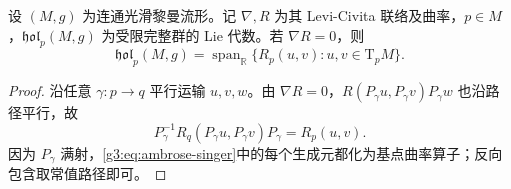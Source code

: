 \begin{corollary}\label{g3:cor:parallel-curvature-holonomy}
	设 \((M,g)\) 为连通光滑黎曼流形。记 \(\nabla,R\) 为其 Levi-Civita 联络及曲率，\(p\in M\)，\(\mathfrak{hol}_p(M,g)\) 为受限完整群的 Lie 代数。若 \(\nabla R=0\)，则
	\[
		\mathfrak{hol}_p(M,g)
		=\operatorname{span}_{\mathbb R}\{R_p(u,v):u,v\in\mathrm T_pM\}.
	\]
\end{corollary}
\begin{proof}
	沿任意 \(\gamma:p\to q\) 平行运输 \(u,v,w\)。由 \(\nabla R=0\)，\(R(P_\gamma u,P_\gamma v)P_\gamma w\) 也沿路径平行，故
	\[
		P_\gamma^{-1}R_q(P_\gamma u,P_\gamma v)P_\gamma=R_p(u,v).
	\]
	因为 \(P_\gamma\) 满射，\eqref{g3:eq:ambrose-singer}中的每个生成元都化为基点曲率算子；反向包含取常值路径即可。
\end{proof}

